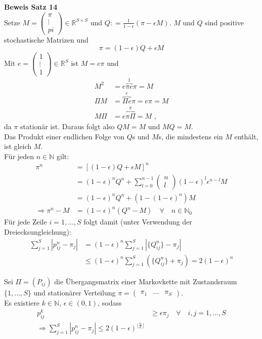 \documentclass[a4paper,12pt]{article}
\begin{document}
\textbf{Beweis Satz 14}\\
Setze $M = \begin{pmatrix} \pi \\ \vdots \\pi \end{pmatrix} \in \mathbb{R}^{S \times S}$ und $Q: = \frac{1}{1-\epsilon}(\pi - \epsilon M)$.
$M$ und $Q$ sind positive stochastische Matrizen und 
$$
\pi = (1-\epsilon)Q + \epsilon M
$$
Mit $e = \begin{pmatrix} 1 \\ \vdots \\ 1 \end{pmatrix} \in \mathbb{R}^S$ ist $M = e \pi$ und
\begin{align*}
M^2 & = e   \overbrace{\pi e}^{1} \pi = M \\
\Pi M & = \overbrace{\Pi e}^{e} \pi = e \pi = M \\
M \Pi &= e \overbrace{\pi \Pi}^{\pi} = M \text{ ,}
\end{align*}
da $\pi$ stationär ist.
Daraus folgt also $QM = M$ und $MQ = M$.\\
Das Produkt einer endlichen Folge von $Q$s und $M$s, die mindestens ein $M$ enthält, ist gleich $M$.\\
Für jeden $n \in \mathbb{N}$ gilt:
\begin{align*}
\pi^n & = \left[(1-\epsilon)Q + \epsilon M\right]^n \\
& = (1-\epsilon)^nQ^n + \sum_{l=0}^{n-1}\begin{pmatrix}n \\ l \end{pmatrix}(1-\epsilon)^l\epsilon^{n-l}M \\
& = (1-\epsilon)^nQ^n + (1-(1-\epsilon)^n)M \\
\Rightarrow \pi^n - M &= (1-\epsilon)^n(Q^n - M) \quad \forall \quad n \in \mathbb{N}_0 
\end{align*}
Für jede Zeile $i=1, ..., S$ folgt damit (unter Verwendung der Dreiecksungleichung):
\begin{align*}
\sum_{j=1}^{S}|p_{ij}^n - \pi_j| &= (1-\epsilon)^n \sum_{j=1}^{S}|\{Q_{ij}^n\} - \pi_j   | \\
& \leq (1-\epsilon)^n\sum_{j=1}^{S}\left(\{Q_{ij}^n\} + \pi_j\right) = 2(1- \epsilon)^n
\end{align*}

\begin{tcolorbox}[breakable, colframe=green, colback=white, title=Satz 15]
Sei $\Pi = (P_{ij})$ die Übergangsmatrix einer Markovkette mit Zustandsraum $\{1, ..., S\}$ und
stationärer Verteilung $\pi = \begin{pmatrix} \pi_1 & ... & \pi_S  \end{pmatrix}$.\\
Es existiere $k \in \mathbb{N}$, $\epsilon \in (0,1)$, sodass
\begin{align*}
p_{ij}^k &\geq \epsilon \pi_j \quad \forall \quad i,j = 1, ..., S\\
\Rightarrow \sum_{j=1}^{S} |p_{ij}^n - \pi_j   | \leq 2(1-\epsilon)^{\lfloor\frac{n}{k} \rfloor}
\end{align*}
\end{tcolorbox}
\end{document}
